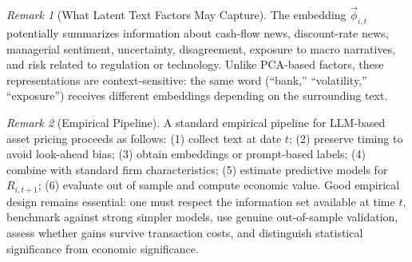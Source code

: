 \documentclass[11pt]{article}
\theoremstyle{definition}
\theoremstyle{plain}
\theoremstyle{remark}
\newtheorem{remark}{Remark}[section]
\begin{document}
\begin{remark}[What Latent Text Factors May Capture]
    The embedding $\vec{\phi}_{i,t}$ potentially summarizes information about cash-flow news, discount-rate news, managerial sentiment, uncertainty, disagreement, exposure to macro narratives, and risk related to regulation or technology. Unlike PCA-based factors, these representations are context-sensitive: the same word (``bank,'' ``volatility,'' ``exposure'') receives different embeddings depending on the surrounding text.
\end{remark}

\begin{remark}[Empirical Pipeline]
    A standard empirical pipeline for LLM-based asset pricing proceeds as follows: (1) collect text at date $t$; (2) preserve timing to avoid look-ahead bias; (3) obtain embeddings or prompt-based labels; (4) combine with standard firm characteristics; (5) estimate predictive models for $R_{i,t+1}$; (6) evaluate out of sample and compute economic value. Good empirical design remains essential: one must respect the information set available at time $t$, benchmark against strong simpler models, use genuine out-of-sample validation, assess whether gains survive transaction costs, and distinguish statistical significance from economic significance.
\end{remark}
\end{document}
